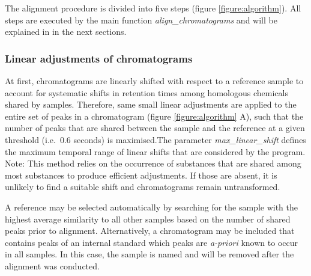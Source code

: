 The alignment procedure is divided into five steps (figure
\ref{figure:algorithm}). All steps are executed by the main function
\emph{align\_chromatograms} and will be explained in in the next
sections. \subsubsection{Linear adjustments of chromatograms} At first,
chromatograms are linearly shifted with respect to a reference sample to
account for systematic shifts in retention times among homologous
chemicals shared by samples. Therefore, same small linear adjustments
are applied to the entire set of peaks in a chromatogram (figure
\ref{figure:algorithm} A), such that the number of peaks that are shared
between the sample and the reference at a given threshold (i.e.~0.6
seconds) is maximised.The parameter \emph{max\_linear\_shift} defines
the maximum temporal range of linear shifts that are considered by the
program. \newline
Note: This method relies on the occurrence of substances that are shared
among most substances to produce efficient adjustments. If those are
absent, it is unlikely to find a suitable shift and chromatograms remain
untransformed. \par
A reference may be selected automatically by searching for the sample
with the highest average similarity to all other samples based on the
number of shared peaks prior to alignment. Alternatively, a chromatogram
may be included that contains peaks of an internal standard which peaks
are \textit{a-priori} known to occur in all samples. In this case, the
sample is named  and will be removed after the
alignment was conducted.

\newpage

